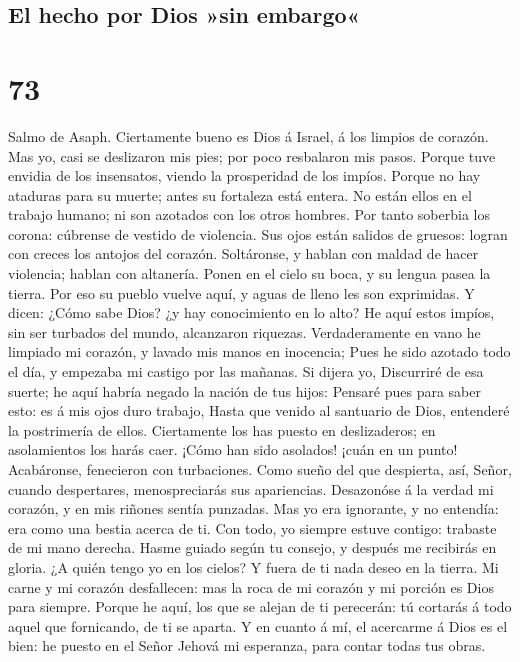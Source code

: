 \hypertarget{el-hecho-por-dios-sin-embargo}{%
\subsection{El hecho por Dios »sin
embargo«}\label{el-hecho-por-dios-sin-embargo}}

\hypertarget{section-72}{%
\section{73}\label{section-72}}

 Salmo de Asaph. Ciertamente bueno es Dios á Israel, á los
limpios de corazón.  Mas yo, casi se deslizaron mis pies;
por poco resbalaron mis pasos.  Porque tuve envidia de los
insensatos, viendo la prosperidad de los impíos.  Porque
no hay ataduras para su muerte; antes su fortaleza está entera.
 No están ellos en el trabajo humano; ni son azotados con
los otros hombres.  Por tanto soberbia los corona:
cúbrense de vestido de violencia.  Sus ojos están salidos
de gruesos: logran con creces los antojos del corazón. 
Soltáronse, y hablan con maldad de hacer violencia; hablan con
altanería.  Ponen en el cielo su boca, y su lengua pasea
la tierra.  Por eso su pueblo vuelve aquí, y aguas de
lleno les son exprimidas.  Y dicen: ¿Cómo sabe Dios? ¿y
hay conocimiento en lo alto?  He aquí estos impíos, sin
ser turbados del mundo, alcanzaron riquezas. 
Verdaderamente en vano he limpiado mi corazón, y lavado mis manos en
inocencia;  Pues he sido azotado todo el día, y empezaba
mi castigo por las mañanas.  Si dijera yo, Discurriré de
esa suerte; he aquí habría negado la nación de tus hijos:
 Pensaré pues para saber esto: es á mis ojos duro
trabajo,  Hasta que venido al santuario de Dios,
entenderé la postrimería de ellos.  Ciertamente los has
puesto en deslizaderos; en asolamientos los harás caer. 
¡Cómo han sido asolados! ¡cuán en un punto! Acabáronse, fenecieron con
turbaciones.  Como sueño del que despierta, así, Señor,
cuando despertares, menospreciarás sus apariencias. 
Desazonóse á la verdad mi corazón, y en mis riñones sentía punzadas.
 Mas yo era ignorante, y no entendía: era como una bestia
acerca de ti.  Con todo, yo siempre estuve contigo:
trabaste de mi mano derecha.  Hasme guiado según tu
consejo, y después me recibirás en gloria.  ¿A quién
tengo yo en los cielos? Y fuera de ti nada deseo en la tierra.
 Mi carne y mi corazón desfallecen: mas la roca de mi
corazón y mi porción es Dios para siempre.  Porque he
aquí, los que se alejan de ti perecerán: tú cortarás á todo aquel que
fornicando, de ti se aparta.  Y en cuanto á mí, el
acercarme á Dios es el bien: he puesto en el Señor Jehová mi esperanza,
para contar todas tus obras.


